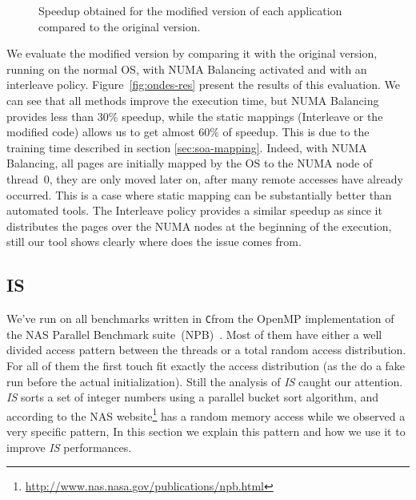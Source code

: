 \begin{figure}[htb]
    \centering
    \caption{Speedup obtained for the modified version of each application
    compared to the original version.}
\end{figure}

We evaluate the modified version by comparing it with the original
version, running on the normal OS, with NUMA Balancing activated and with an
interleave policy. Figure~\ref{fig:ondes-res} present the results of this
evaluation. We can see that all methods improve the execution time, but
NUMA Balancing provides less than $30\%$ speedup, while the static mappings
(Interleave or the modified code) allows us to get almost $60\%$ of speedup. This is
due to the training time described in section \ref{sec:soa-mapping}. Indeed,
with NUMA Balancing, all pages are initially mapped by the OS to the NUMA node
of thread~$0$, they
are only moved later on, after many remote accesses have already occurred. This is a case where static mapping can be substantially better than automated
tools. The Interleave policy provides a similar speedup as
\TABARNAC since it distributes the pages over the NUMA nodes at the beginning of
the execution, still our tool shows clearly where does the issue comes from.


\subsection{IS}
\label{sec:exp-is}


We've run \TABARNAC on all benchmarks written in \texttt{C}from the OpenMP
implementation of the NAS Parallel Benchmark suite~(NPB)~\cite{Jin1999}. Most
of them have either a well divided access pattern between the threads or a
total random access distribution. For all of them the first touch fit exactly
the access distribution (as the do a fake run before the actual
initialization). Still the analysis of \emph{IS} caught our attention.
\emph{IS} sorts a set of integer numbers using a parallel bucket sort
algorithm, and according to the NAS
website\footnote{\url{http://www.nas.nasa.gov/publications/npb.html}} has a
random memory access while we observed a very specific pattern, In this
section we explain this pattern and how we use it to improve \emph{IS}
performances.

